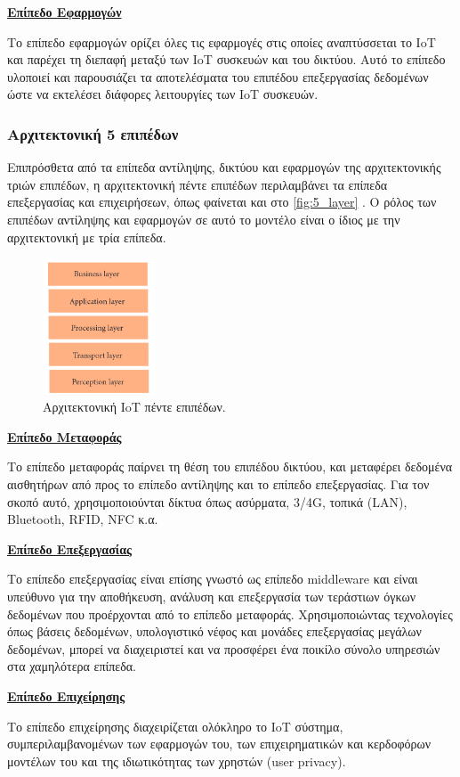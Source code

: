 \textbf{\underline{Επίπεδο Εφαρμογών}}

Το επίπεδο εφαρμογών ορίζει όλες τις εφαρμογές στις οποίες αναπτύσσεται το IoT και παρέχει τη διεπαφή μεταξύ των IoT συσκευών και του δικτύου. Αυτό το επίπεδο υλοποιεί και παρουσιάζει τα αποτελέσματα του επιπέδου επεξεργασίας δεδομένων ώστε να εκτελέσει διάφορες λειτουργίες των IoT συσκευών.

\subsubsection{Αρχιτεκτονική 5 επιπέδων}
\label{subsubsec:5_layer}

Επιπρόσθετα από τα επίπεδα αντίληψης, δικτύου και εφαρμογών της αρχιτεκτονικής τριών επιπέδων, η αρχιτεκτονική πέντε επιπέδων περιλαμβάνει τα επίπεδα επεξεργασίας και επιχειρήσεων, όπως φαίνεται και στο \autoref{fig:5_layer} \cite{bib:sethi_2017}. Ο ρόλος των επιπέδων αντίληψης και εφαρμογών σε αυτό το μοντέλο είναι ο ίδιος με την αρχιτεκτονική με τρία επίπεδα.

\begin{figure}[!ht]
	\centering
	\includegraphics[width=0.3\textwidth]{./images/chapter2/5_layer.png}
	\caption{Αρχιτεκτονική IoT πέντε επιπέδων.}
	\label{fig:5_layer}
\end{figure}

\textbf{\underline{Επίπεδο Μεταφοράς}}

Το επίπεδο μεταφοράς παίρνει τη θέση του επιπέδου δικτύου, και μεταφέρει δεδομένα αισθητήρων από προς το επίπεδο αντίληψης και το επίπεδο επεξεργασίας. Για τον σκοπό αυτό, χρησιμοποιούνται δίκτυα όπως ασύρματα, 3/4G, τοπικά (LAN), Bluetooth, RFID, NFC κ.α.

\textbf{\underline{Επίπεδο Επεξεργασίας}}

Το επίπεδο επεξεργασίας είναι επίσης γνωστό ως επίπεδο middleware και είναι υπεύθυνο για την αποθήκευση, ανάλυση και επεξεργασία των τεράστιων όγκων δεδομένων που προέρχονται από το επίπεδο μεταφοράς. Χρησιμοποιώντας τεχνολογίες όπως βάσεις δεδομένων, υπολογιστικό νέφος και μονάδες επεξεργασίας μεγάλων δεδομένων, μπορεί να διαχειριστεί και να προσφέρει ένα ποικίλο σύνολο υπηρεσιών στα χαμηλότερα επίπεδα.

\textbf{\underline{Επίπεδο Επιχείρησης}}

Το επίπεδο επιχείρησης διαχειρίζεται ολόκληρο το IoT σύστημα, συμπεριλαμβανομένων των εφαρμογών του, των επιχειρηματικών και κερδοφόρων μοντέλων του και της ιδιωτικότητας των χρηστών (user privacy).